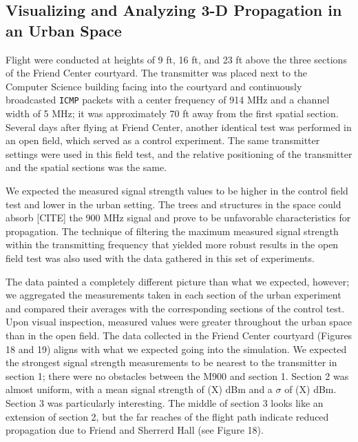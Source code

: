 \documentclass[pageno]{jpaper}
\begin{document}
\subsection{Visualizing and Analyzing 3-D Propagation in an Urban Space}
Flight were conducted at heights of 9 ft, 16 ft, and 23 ft above the three sections of the Friend Center courtyard. The transmitter was placed next to the Computer Science building facing into the courtyard and continuously broadcasted \texttt{ICMP} packets with a center frequency of 914 MHz and a channel width of 5 MHz; it was approximately 70 ft away from the first spatial section. Several days after flying at Friend Center, another identical test was performed in an open field, which served as a control experiment. The same transmitter settings were used in this field test, and the relative positioning of the transmitter and the spatial sections was the same. 

We expected the measured signal strength values to be higher in the control field test and lower in the urban setting. The trees and structures in the space could absorb [CITE] the 900 MHz signal and prove to be unfavorable characteristics for propagation. The technique of filtering the maximum measured signal strength within the transmitting frequency that yielded more robust results in the open field test was also used with the data gathered in this set of experiments. 

The data painted a completely different picture than what we expected, however; we aggregated the measurements taken in each section of the urban experiment and compared their averages with the corresponding sections of the control test. Upon visual inspection, measured values were greater throughout the urban space than in the open field. The data collected in the Friend Center courtyard (Figures 18 and 19) aligns with what we expected going into the simulation. We expected the strongest signal strength measurements to be nearest to the transmitter in section 1; there were no obstacles between the M900 and section 1. Section 2 was almost uniform, with a mean signal strength of (X) dBm and a $\sigma$ of (X) dBm. Section 3 was particularly interesting. The middle of section 3 looks like an extension of section 2, but the far reaches of the flight path indicate reduced propagation due to Friend and Sherrerd Hall (see Figure 18). 
\end{document}
